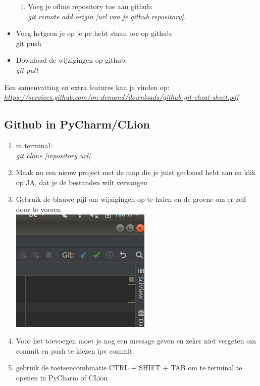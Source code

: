 \documentclass[a4paper, titlepage]{article}
\begin{document}
\begin{itemize}
\begin{enumerate}
					\item Voeg je ofline repository toe aan github:\\ \textit{git remote add origin [url van je github repository]}.
				\end{enumerate}
				
				\item Voeg hetgeen je op je pc hebt staan toe op github:\\ git push
				
				\item Download de wijzigingen op github:\\ \textit{git pull}
			\end{itemize}
			
			Een samenvatting en extra features kan je vinden op:\\ \href{https://services.github.com/on-demand/downloads/github-git-cheat-sheet.pdf}{\textit{https://services.github.com/on-demand/downloads/github-git-cheat-sheet.pdf}}
		
		\subsection{Github in PyCharm/CLion}
		\begin{enumerate}
			\item in terminal:\\ \textit{git clone [repository url]}
			\item Maak nu een nieuw project met de map die je juist gecloned hebt aan en klik op JA, dat je de bestanden wilt vervangen
			
			\item Gebruik de blauwe pijl om wijzigingen op te halen en de groene om er zelf door te voeren \\
			\includegraphics[scale=0.3]{img/pushpull}
			
			\item Voor het toevoegen moet je nog een message geven en zeker niet vergeten om commit en push te kiezen ipv commit
			\item gebruik de toetsencombinatie CTRL + SHIFT + TAB om te terminal te openen in PyCharm of CLion

		\end{enumerate}
		
\end{document}
